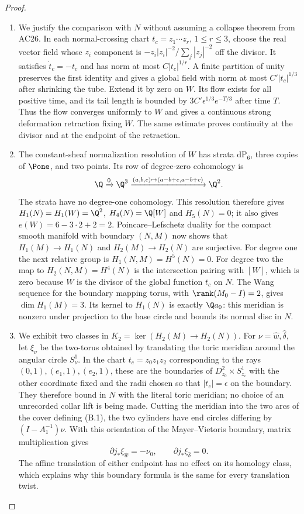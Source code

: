\begin{proof}
\begin{enumerate}[label=\arabic*.,leftmargin=*]
\item We justify the comparison with $N$ without assuming a collapse
theorem from AC26. In each normal-crossing chart
$t_c=z_1\cdots z_r$, $1\le r\le3$, choose the real vector field
whose $z_i$ component is
$-z_i|z_i|^{-2}/\sum_j|z_j|^{-2}$ off the divisor.
It satisfies $\dot t_c=-t_c$ and has norm at most
$C|t_c|^{1/r}$. A finite partition of unity preserves the first
identity and gives a global field with norm at most
$C'|t_c|^{1/3}$ after shrinking the tube. Extend it by zero on $W$.
Its flow exists for all positive time, and its tail length is
bounded by $3C'\epsilon^{1/3}e^{-T/3}$ after time $T$.
Thus the flow converges uniformly to $W$ and gives a continuous
strong deformation retraction fixing $W$. The same estimate proves
continuity at the divisor and at the endpoint of the retraction.

\item The constant-sheaf normalization resolution of $W$ has strata
$\mathrm{dP}_6$, three copies of $\Pone$, and two points.
Its row of degree-zero cohomology is
\[
 \Q\xrightarrow{0}\Q^3
 \xrightarrow{(a,b,c)\mapsto(a-b+c,a-b+c)}\Q^2.
\]
The strata have no degree-one cohomology. This resolution therefore
gives $H_1(N)=H_1(W)=\Q^2$, $H_4(N)=\Q[W]$ and $H_5(N)=0$;
it also gives $e(W)=6-3\cdot2+2=2$.
Poincare--Lefschetz duality for the compact smooth manifold with
boundary $(N,M)$ now shows that $H_1(M)\to H_1(N)$ and
$H_2(M)\to H_2(N)$ are surjective. For degree one the next
relative group is $H_1(N,M)=H^5(N)=0$.
For degree two the map to $H_2(N,M)=H^4(N)$ is the intersection
pairing with $[W]$, which is zero because $W$ is the divisor of
the global function $t_c$ on $N$. The Wang sequence for the
boundary mapping torus, with $\rank(M_0-I)=2$, gives
$\dim H_1(M)=3$. Its kernel to $H_1(N)$ is exactly
$\Q a_0$: this meridian is nonzero under projection to the base
circle and bounds its normal disc in $N$.

\item We exhibit two classes in
$K_2=\ker(H_2(M)\to H_2(N))$.
For $\nu=\hat w,\hat\delta$, let $\xi_\nu$ be the two-torus
obtained by translating the toric meridian around the angular
circle $S^1_\nu$. In the chart $t_c=z_0z_1z_2$ corresponding to
the rays $(0,1),(e_1,1),(e_2,1)$, these are the boundaries of
$D^2_{z_0}\times S^1_{z_i}$ with the other coordinate fixed
and the radii chosen so that $|t_c|=\epsilon$ on the boundary.
They therefore bound in $N$ with the literal toric meridian;
no choice of an unrecorded collar lift is being made.
Cutting the meridian into the two arcs of the cover defining
(B.1), the two cylinders have end circles differing by
$(I-A_1^{-1})\nu$. With this orientation of the Mayer--Vietoris
boundary, matrix multiplication gives
\[
 \partial j_*\xi_{\hat w}=-\nu_0,\qquad
 \partial j_*\xi_{\hat\delta}=0.                       \tag{B.3}
\]
The affine translation of either endpoint has no effect on its
homology class, which explains why this boundary formula is the
same for every translation twist.


\end{enumerate}
\end{proof}

